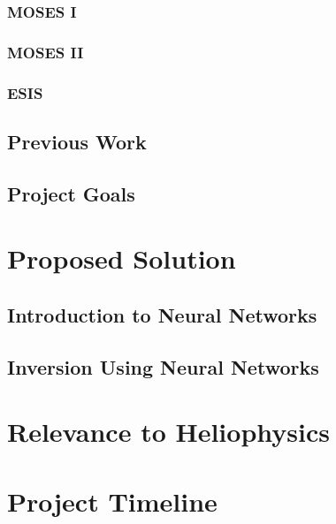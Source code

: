 \documentclass{article}
\begin{document}
			\subsubsection{MOSES I}



			\subsubsection{MOSES II}
			\subsubsection{ESIS}
		\subsection{Previous Work}
			\label{pwork}
		\subsection{Project Goals}
	\section{Proposed Solution}
		\label{prop_sol}
		\subsection{Introduction to Neural Networks}
		\subsection{Inversion Using Neural Networks}
	\section{Relevance to Heliophysics}
	\section{Project Timeline}
	

	\printbibliography

	
\end{document}
